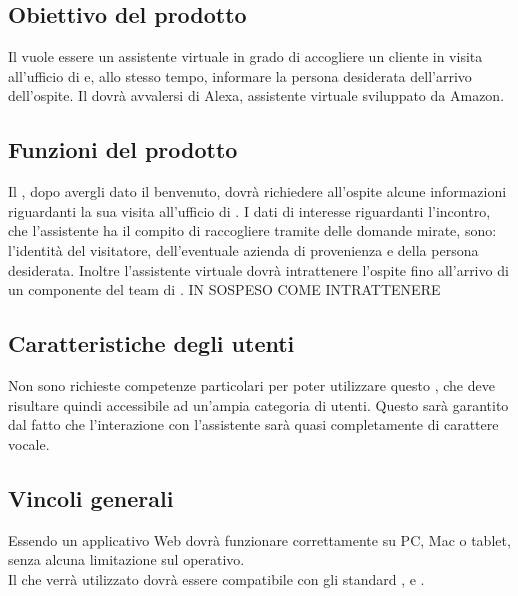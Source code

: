 \subsection{Obiettivo del prodotto}
Il  vuole essere un assistente virtuale in grado di accogliere un cliente in visita all'ufficio di \PROPONENTE{} e, allo stesso tempo, informare la persona desiderata dell'arrivo dell'ospite. Il  dovrà avvalersi di Alexa, assistente virtuale sviluppato da Amazon.
\subsection{Funzioni del prodotto}
Il , dopo avergli dato il benvenuto, dovrà richiedere all'ospite alcune informazioni riguardanti la sua visita all'ufficio di \PROPONENTE. 
I dati di interesse riguardanti l'incontro, che l'assistente ha il compito di raccogliere tramite delle domande mirate, sono: l'identità del visitatore, dell'eventuale azienda di provenienza e della persona desiderata. Inoltre l'assistente virtuale dovrà intrattenere l'ospite fino all'arrivo di un componente del team di \PROPONENTE{}. IN SOSPESO COME INTRATTENERE 
\subsection{Caratteristiche degli utenti}
Non sono richieste competenze particolari per poter utilizzare questo , che deve risultare
quindi accessibile ad un'ampia categoria di utenti. Questo sarà garantito dal fatto che l'interazione con l'assistente sarà quasi completamente di carattere vocale.
\subsection{Vincoli generali}
Essendo un applicativo Web dovrà funzionare correttamente su PC, Mac o tablet, senza alcuna limitazione sul  operativo.\\
Il  che verrà utilizzato dovrà essere compatibile con gli standard ,  e .